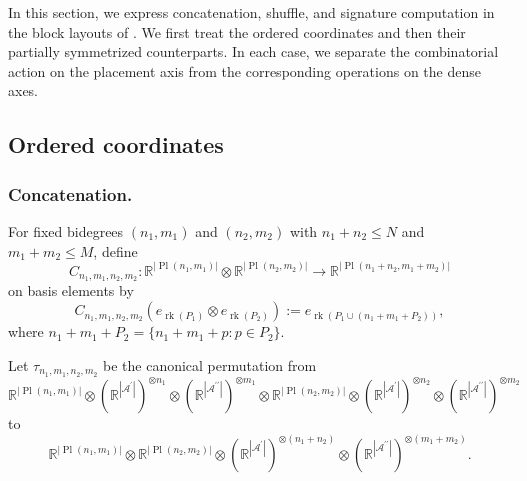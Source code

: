 \documentclass{amsart}
\theoremstyle{definition}
\theoremstyle{remark}
\begin{document}
In this section, we express concatenation, shuffle, and signature computation
in the block layouts of . We first treat the
ordered coordinates and then their partially symmetrized counterparts. In each
case, we separate the combinatorial action on the placement axis from the
corresponding operations on the dense axes.

\subsection{Ordered coordinates}

\subsubsection{Concatenation.}\label{sec:ord_concat}
For fixed bidegrees $(n_1,m_1)$ and $(n_2,m_2)$ with
$n_1+n_2\leq N$ and $m_1+m_2\leq M$, define
\[
    C_{n_1,m_1,n_2,m_2}
    \colon
    \mathbb{R}^{|\operatorname{Pl}(n_1,m_1)|}
    \otimes
    \mathbb{R}^{|\operatorname{Pl}(n_2,m_2)|}
    \longrightarrow
    \mathbb{R}^{|\operatorname{Pl}(n_1+n_2,m_1+m_2)|}
\]
on basis elements by
\[
    C_{n_1,m_1,n_2,m_2}
    \left(
        e_{\operatorname{rk}(P_1)}
        \otimes
        e_{\operatorname{rk}(P_2)}
    \right)
    :=
    e_{\operatorname{rk}
        \left(
            P_1\cup(n_1+m_1+P_2)
        \right)},
\]
where
$n_1+m_1+P_2
=
\{n_1+m_1+p:p\in P_2\}$.

Let $\tau_{n_1,m_1,n_2,m_2}$ be the canonical permutation from
\[
    \mathbb{R}^{|\operatorname{Pl}(n_1,m_1)|}
    \otimes
    \left(
        \mathbb{R}^{|\mathcal{A}^{\prime}|}
    \right)^{\otimes n_1}
    \otimes
    \left(
        \mathbb{R}^{|\mathcal{A}^{\prime\prime}|}
    \right)^{\otimes m_1}
    \otimes
    \mathbb{R}^{|\operatorname{Pl}(n_2,m_2)|}
    \otimes
    \left(
        \mathbb{R}^{|\mathcal{A}^{\prime}|}
    \right)^{\otimes n_2}
    \otimes
    \left(
        \mathbb{R}^{|\mathcal{A}^{\prime\prime}|}
    \right)^{\otimes m_2}
\]
to
\[
    \mathbb{R}^{|\operatorname{Pl}(n_1,m_1)|}
    \otimes
    \mathbb{R}^{|\operatorname{Pl}(n_2,m_2)|}
    \otimes
    \left(
        \mathbb{R}^{|\mathcal{A}^{\prime}|}
    \right)^{\otimes(n_1+n_2)}
    \otimes
    \left(
        \mathbb{R}^{|\mathcal{A}^{\prime\prime}|}
    \right)^{\otimes(m_1+m_2)}.
\]
\end{document}
